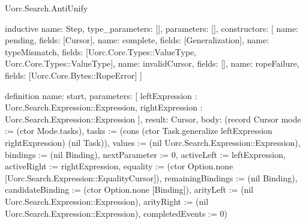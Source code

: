 \begin{lexlean}{Uorc.Search.AntiUnify}
\begin{semanticmodule}
inductive{
  name: Step,
  type_parameters: [],
  parameters: [],
  constructors: [
    {name: pending, fields: [Cursor]},
    {name: complete, fields: [Generalization]},
    {name: typeMismatch, fields: [Uorc.Core.Types::ValueType, Uorc.Core.Types::ValueType]},
    {name: invalidCursor, fields: []},
    {name: ropeFailure, fields: [Uorc.Core.Bytes::RopeError]}
  ]
}

definition{
  name: start,
  parameters: [
    leftExpression : Uorc.Search.Expression::Expression,
    rightExpression : Uorc.Search.Expression::Expression
  ],
  result: Cursor,
  body: (record Cursor {mode := (ctor Mode.tasks), tasks := (cons (ctor Task.generalize leftExpression rightExpression) (nil Task)), values := (nil Uorc.Search.Expression::Expression), bindings := (nil Binding), nextParameter := 0, activeLeft := leftExpression, activeRight := rightExpression, equality := (ctor Option.none [Uorc.Search.Expression::EqualityCursor]), remainingBindings := (nil Binding), candidateBinding := (ctor Option.none [Binding]), arityLeft := (nil Uorc.Search.Expression::Expression), arityRight := (nil Uorc.Search.Expression::Expression), completedEvents := 0})
}


\end{semanticmodule}
\end{lexlean}
